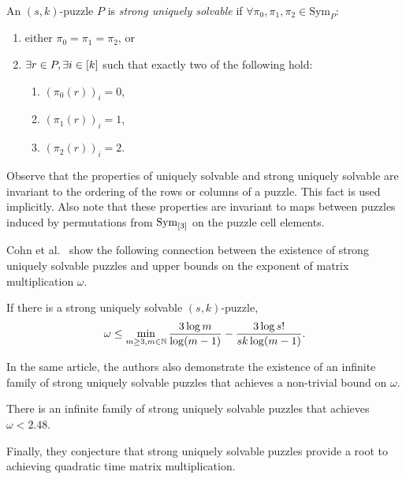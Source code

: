 \documentclass[11pt]{article}
\newcommand\Sym[1]{\ensuremath{\mathrm{Sym}_{#1}}}
\begin{document}
\begin{definition}
  ~\\
  An $(s,k)$-puzzle $P$ is \emph{strong uniquely solvable} if
  $\forall \pi_0, \pi_1, \pi_2 \in \Sym{P}:$
  \begin{enumerate}
  \item either $\pi_0 = \pi_1 = \pi_2$, or
  \item $\exists r \in P, \exists i \in [k]$ such that exactly two
    of the following hold:
    \begin{enumerate}
    \item $(\pi_0(r))_i = 0$,
    \item $(\pi_1(r))_i = 1$,
    \item $(\pi_2(r))_i = 2$.
    \end{enumerate}
  \end{enumerate}
  
\end{definition}

Observe that the properties of uniquely solvable and strong uniquely
solvable are invariant to the ordering of the rows or columns of a
puzzle.  This fact is used implicitly.  Also note that these
properties are invariant to maps between puzzles induced by
permutations from \Sym{\ordset{3}} on the puzzle cell elements.

Cohn et al.~ show the following connection between the existence of
strong uniquely solvable puzzles and upper bounds on the exponent of
matrix multiplication $\omega$.

\begin{lemma}
  If there is a strong uniquely solvable $(s,k)$-puzzle,
  $$\omega \le \min_{m \ge 3, m \in \mathbb{N}} \frac{3 \log
    m}{\log(m-1)} - \frac{3 \log s!}{sk \log(m-1)}.$$
\end{lemma}

In the same article, the authors also demonstrate the existence of an
infinite family of strong uniquely solvable puzzles that achieves a
non-trivial bound on $\omega$.

\begin{lemma}
  There is an infinite family of strong uniquely solvable puzzles that
  achieves $\omega < 2.48$.
\end{lemma}

Finally, they conjecture that strong uniquely solvable puzzles provide
a root to achieving quadratic time matrix multiplication.
\end{document}
